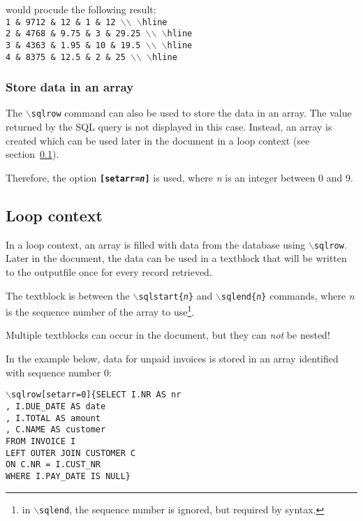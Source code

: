 \documentclass{article}
\newcommand{\bs}{\ensuremath{\backslash}}
\newcommand{\vs}{\vspace{3mm}}
\begin{document}
\vs

would procude the following result: \\
\texttt{1 \& 9712 \& 12 \& 1 \& 12 \bs\bs~\bs hline \\
2 \& 4768 \& 9.75 \& 3 \& 29.25 \bs\bs~\bs hline \\
3 \& 4363 \& 1.95 \& 10 \& 19.5 \bs\bs~\bs hline \\
4 \& 8375 \& 12.5 \& 2 \& 25 \bs\bs~\bs hline}



\subsubsection{Store data in an array}


The \texttt{\bs sqlrow} command can also be used to store the data in an array. The value returned by the SQL query is not displayed in this case. Instead, an array is created which can be used later in the document in a loop context (see section~\ref{loops}).

Therefore, the option \texttt{\textbf{[setarr=\textit{n}]}} is used, where \textit{n} is an integer between
0 and 9.

\subsection{Loop context}\label{loops}

In a loop context, an array is filled with data from the database using \texttt{\bs sqlrow}.\\
Later in the document, the data can be used in a textblock that will be written to the outputfile once for every record retrieved.

\vs

The textblock is between the \texttt{\bs sqlstart\{\textit{n}\}} and \texttt{\bs sqlend\{\textit{n}\}} commands, where \textit{n} is the sequence number of the array to use\footnote{ in \texttt{\bs sqlend}, the sequence number is ignored, but required by syntax.}.

Multiple textblocks can occur in the document, but they can \textit{not} be nested!

\vs

In the example below, data for unpaid invoices is stored in an array identified with sequence number 0:
 
\texttt{\bs sqlrow[setarr=0]\{SELECT I.NR AS nr\\
\hspace*{15mm},  I.DUE\_DATE AS date\\
\hspace*{15mm},  I.TOTAL AS amount\\
\hspace*{15mm},  C.NAME AS customer\\
\hspace*{15mm}FROM INVOICE I\\
\hspace*{15mm}LEFT OUTER JOIN CUSTOMER C\\
\hspace*{20mm}ON C.NR = I.CUST\_NR\\
\hspace*{15mm}WHERE I.PAY\_DATE IS NULL\}}
\end{document}
